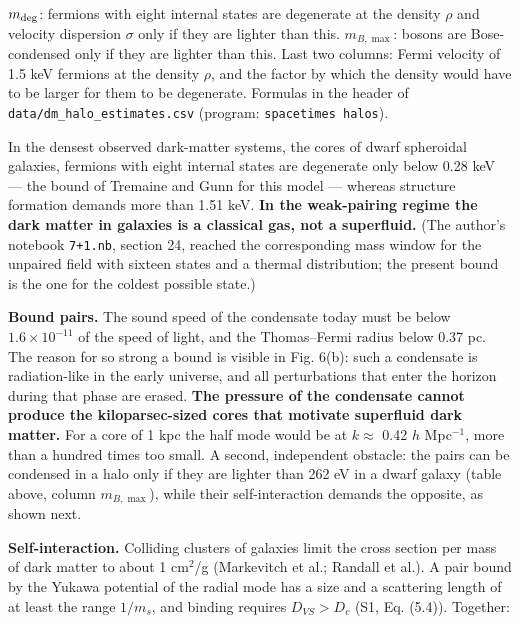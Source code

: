 \documentclass[
  10pt,
]{article}
\begin{document}
\(m_{\rm deg}\): fermions with eight internal states are degenerate at
the density \(\rho\) and velocity dispersion \(\sigma\) only if they are
lighter than this. \(m_{B,\max}\): bosons are Bose-condensed only if
they are lighter than this. Last two columns: Fermi velocity of 1.5 keV
fermions at the density \(\rho\), and the factor by which the density
would have to be larger for them to be degenerate. Formulas in the
header of \texttt{data/dm\_halo\_estimates.csv} (program:
\texttt{spacetimes\ halos}).

In the densest observed dark-matter systems, the cores of dwarf
spheroidal galaxies, fermions with eight internal states are degenerate
only below 0.28 keV --- the bound of Tremaine and Gunn for this model
--- whereas structure formation demands more than 1.51 keV. \textbf{In
the weak-pairing regime the dark matter in galaxies is a classical gas,
not a superfluid.} (The author's notebook \texttt{7+1.nb}, section 24,
reached the corresponding mass window for the unpaired field with
sixteen states and a thermal distribution; the present bound is the one
for the coldest possible state.)

\textbf{Bound pairs.} The sound speed of the condensate today must be
below \(1.6\times10^{-11}\) of the speed of light, and the Thomas--Fermi
radius below 0.37 pc. The reason for so strong a bound is visible in
Fig. 6(b): such a condensate is radiation-like in the early universe,
and all perturbations that enter the horizon during that phase are
erased. \textbf{The pressure of the condensate cannot produce the
kiloparsec-sized cores that motivate superfluid dark matter.} For a core
of 1 kpc the half mode would be at \(k\approx\) 0.42 \(h\) Mpc\(^{-1}\),
more than a hundred times too small. A second, independent obstacle: the
pairs can be condensed in a halo only if they are lighter than 262 eV in
a dwarf galaxy (table above, column \(m_{B,\max}\)), while their
self-interaction demands the opposite, as shown next.

\textbf{Self-interaction.} Colliding clusters of galaxies limit the
cross section per mass of dark matter to about 1 cm\(^2\)/g (Markevitch
et al.; Randall et al.). A pair bound by the Yukawa potential of the
radial mode has a size and a scattering length of at least the range
\(1/m_s\), and binding requires \(D_{VS}>D_c\) (S1, Eq. (5.4)).
Together:
\end{document}
